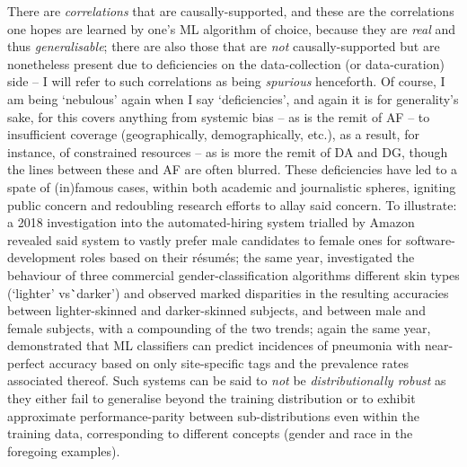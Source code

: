 %
There are \emph{correlations} that are causally-supported, and these are the correlations one hopes
are learned by one's \ac{ML} algorithm of choice, because they are \emph{real} and thus
\emph{generalisable}; there are also those that are \emph{not} causally-supported but are
nonetheless present due to deficiencies on the data-collection (or data-curation) side -- I will
refer to such correlations as being \emph{spurious} henceforth.
%
Of course, I am being `nebulous' again when I say `deficiencies', and again it is for generality's
sake, for this covers anything from systemic bias -- as is the remit of \ac{AF} -- to insufficient
coverage (geographically, demographically, etc.), as a result, for instance, of constrained
resources -- as is more the remit of \ac{DA} and \ac{DG}, though the lines between these and AF are
often blurred.
%
These deficiencies have led to a spate of (in)famous cases, within both academic and journalistic
spheres, igniting public concern and redoubling research efforts to allay said concern.
%
To illustrate: a 2018 investigation \citep{dastin2018amazon} into the automated-hiring system
trialled by Amazon revealed said system to vastly prefer male candidates to female ones for
software-development roles based on their r\'esum\'es; the same year, \citet{buolamwini2018gender}
investigated the behaviour of three commercial gender-classification algorithms \wrt{} different
skin types (`lighter' vs\. `darker') and observed marked disparities in the resulting accuracies
between lighter-skinned and darker-skinned subjects, and between male and female subjects, with a
compounding of the two trends; again the same year, \citet{zech2018variable} demonstrated that
\ac{ML} classifiers can predict incidences of pneumonia with near-perfect accuracy based on only
site-specific tags and the prevalence rates associated thereof.
%
Such systems can be said to \emph{not} be \emph{distributionally robust} as they either fail to
generalise beyond the training distribution or to exhibit approximate performance-parity between
sub-distributions even within the training data, corresponding to different concepts (gender and
race in the foregoing examples).

